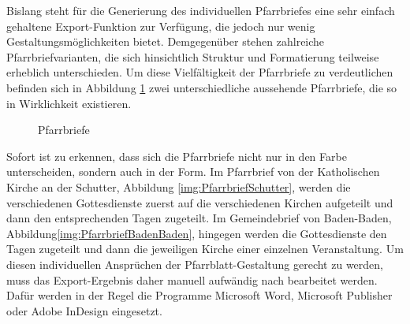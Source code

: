 Bislang steht für die Generierung des individuellen Pfarrbriefes eine sehr einfach gehaltene Export-Funktion zur Verfügung, die jedoch nur wenig Gestaltungsmöglichkeiten bietet. Demgegenüber stehen zahlreiche Pfarrbriefvarianten, die sich hinsichtlich Struktur und Formatierung teilweise erheblich unterschieden.
\abschnitt
Um diese Vielfältigkeit der Pfarrbriefe zu verdeutlichen befinden sich in Abbildung \ref{img:Gemeindebrief} zwei unterschiedliche aussehende Pfarrbriefe, die so in Wirklichkeit existieren.\abschnitt
\begin{figure}[h]
    \caption{Pfarrbriefe}
    \label{img:Gemeindebrief}
\end{figure}\newline
Sofort ist zu erkennen, dass sich die Pfarrbriefe nicht nur in den Farbe unterscheiden, sondern auch in der Form. Im Pfarrbrief von der Katholischen Kirche an der Schutter, Abbildung \ref{img:PfarrbriefSchutter}, werden die verschiedenen Gottesdienste zuerst auf die verschiedenen Kirchen aufgeteilt und dann den entsprechenden Tagen zugeteilt. Im Gemeindebrief von Baden-Baden, Abbildung\ref{img:PfarrbriefBadenBaden}, hingegen werden die Gottesdienste den Tagen zugeteilt und dann die jeweiligen Kirche einer einzelnen Veranstaltung.
\abschnitt
Um diesen individuellen Ansprüchen der Pfarrblatt-Gestaltung gerecht zu werden, muss das Export-Ergebnis daher manuell aufwändig nach bearbeitet werden. Dafür werden in der Regel die Programme Microsoft Word, Microsoft Publisher oder Adobe InDesign eingesetzt.
